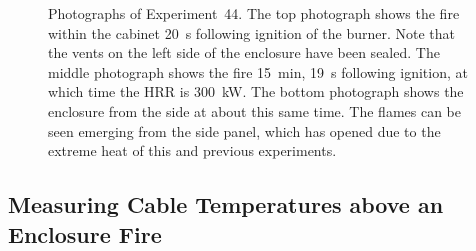 \begin{figure}[p]
\caption[Photographs of Experiment~44]{Photographs of Experiment~44. The top photograph shows the fire within the cabinet 20~s following ignition of the burner. Note that the vents on the left side of the enclosure have been sealed. The middle photograph shows the fire 15~min, 19~s following ignition, at which time the HRR is 300~kW. The bottom photograph shows the enclosure from the side at about this same time. The flames can be seen emerging from the side panel, which has opened due to the extreme heat of this and previous experiments.}
\label{fig:Test_44_photos}
\end{figure}


\clearpage


\subsection{Measuring Cable Temperatures above an Enclosure Fire}

